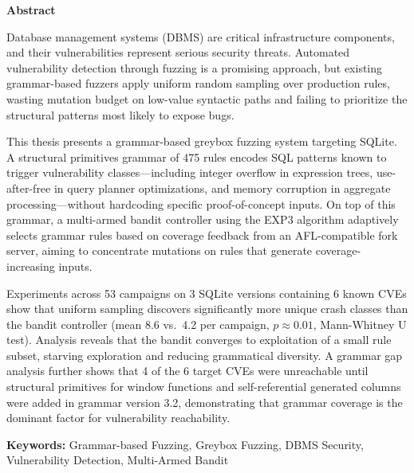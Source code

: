 \begin{center}
\textbf{\large{Abstract}}
\end{center}
\begin{small}

Database management systems (DBMS) are critical infrastructure components, and their vulnerabilities represent serious security threats. Automated vulnerability detection through fuzzing is a promising approach, but existing grammar-based fuzzers apply uniform random sampling over production rules, wasting mutation budget on low-value syntactic paths and failing to prioritize the structural patterns most likely to expose bugs.

This thesis presents a grammar-based greybox fuzzing system targeting SQLite. A structural primitives grammar of 475 rules encodes SQL patterns known to trigger vulnerability classes---including integer overflow in expression trees, use-after-free in query planner optimizations, and memory corruption in aggregate processing---without hardcoding specific proof-of-concept inputs. On top of this grammar, a multi-armed bandit controller using the EXP3 algorithm adaptively selects grammar rules based on coverage feedback from an AFL-compatible fork server, aiming to concentrate mutations on rules that generate coverage-increasing inputs.

Experiments across 53 campaigns on 3 SQLite versions containing 6 known CVEs show that uniform sampling discovers significantly more unique crash classes than the bandit controller (mean 8.6 vs.\ 4.2 per campaign, $p \approx 0.01$, Mann-Whitney U test). Analysis reveals that the bandit converges to exploitation of a small rule subset, starving exploration and reducing grammatical diversity. A grammar gap analysis further shows that 4 of the 6 target CVEs were unreachable until structural primitives for window functions and self-referential generated columns were added in grammar version 3.2, demonstrating that grammar coverage is the dominant factor for vulnerability reachability.

\vspace*{1cm}
\textbf{Keywords:} Grammar-based Fuzzing, Greybox Fuzzing, DBMS Security, Vulnerability Detection, Multi-Armed Bandit
\end{small}
